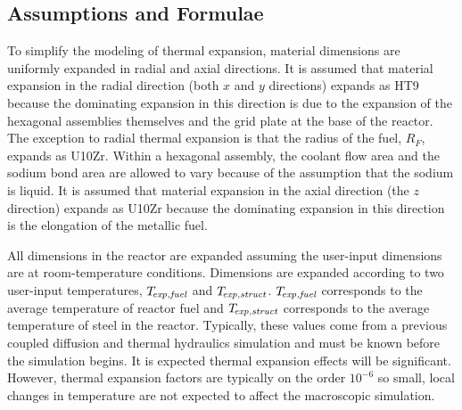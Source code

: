   \subsection{Assumptions and Formulae}
  \label{sec:model_details__assumptions_and_formulae}
    To simplify the modeling of thermal expansion, material dimensions are
    uniformly expanded in radial and axial directions. It is assumed that 
    material expansion in the radial direction (both $x$ and $y$ directions) 
    expands as HT9 because the dominating expansion in this direction is due to 
    the expansion of the hexagonal assemblies themselves and the grid plate at
    the base of the reactor. The exception to radial thermal expansion is that 
    the radius of the fuel, $R_F$, expands as U10Zr.  Within a hexagonal 
    assembly, the coolant flow area and the sodium bond area are allowed to 
    vary because of the assumption that the sodium is liquid.  It is assumed 
    that material expansion in the axial direction (the $z$ direction) expands 
    as U10Zr because the dominating expansion in this direction is the 
    elongation of the metallic fuel.
    
    All dimensions in the reactor are expanded assuming the user-input 
    dimensions are at room-temperature conditions. Dimensions are expanded
    according to two user-input temperatures, ${T_{\!\mbox{\scriptsize \em exp,fuel}}}$ and $T_{\!\mbox{\scriptsize \em exp,struct}}$.
    ${T_{\!\mbox{\scriptsize \em exp,fuel}}}$ corresponds to the average temperature of reactor fuel and
    $T_{\!\mbox{\scriptsize \em exp,struct}}$ corresponds to the average temperature of steel in the
    reactor. Typically, these values come from a previous coupled diffusion and
    thermal hydraulics simulation and must be known before the simulation 
    begins. It is expected thermal expansion effects will be significant. 
    However, thermal expansion factors are typically on the order $10^{-6}$ so 
    small, local changes in temperature are not expected to affect the 
    macroscopic simulation.

